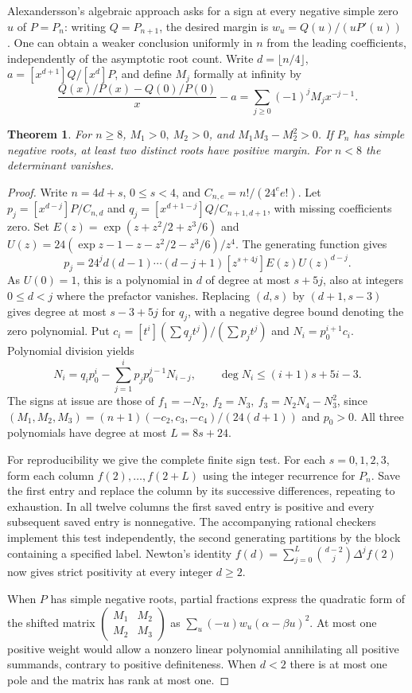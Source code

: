 \documentclass[11pt]{article}
\newtheorem{theorem}{Theorem}
\begin{document}
Alexandersson's algebraic approach asks for a sign at every negative simple
zero \(u\) of \(P=P_n\): writing \(Q=P_{n+1}\), the desired margin is
\(w_u=Q(u)/(uP'(u))\) \cite{rrdensity}. One can obtain a weaker conclusion
uniformly in \(n\) from the leading coefficients, independently of the
asymptotic root count. Write \(d=\lfloor n/4\rfloor\),
\(a=[x^{d+1}]Q/[x^d]P\), and define \(M_j\) formally at infinity by
\[
 \frac{Q(x)/P(x)-Q(0)/P(0)}{x}-a
       =\sum_{j\ge0}(-1)^jM_j x^{-j-1}.
\]
\begin{theorem}\label{thm:twopoles}
For \(n\ge8\), \(M_1>0,\ M_2>0\), and \(M_1M_3-M_2^2>0\).
If \(P_n\) has simple negative roots, at least two distinct roots have
positive margin. For \(n<8\) the determinant vanishes.
\end{theorem}
\begin{proof}
Write \(n=4d+s\), \(0\le s<4\), and \(C_{n,e}=n!/(24^e e!)\).
Let \(p_j=[x^{d-j}]P/C_{n,d}\) and
\(q_j=[x^{d+1-j}]Q/C_{n+1,d+1}\), with missing coefficients zero.
Set \(E(z)=\exp(z+z^2/2+z^3/6)\) and
\(U(z)=24(\exp z-1-z-z^2/2-z^3/6)/z^4\). The generating function gives
\[
 p_j=24^j d(d-1)\cdots(d-j+1)[z^{s+4j}]E(z)U(z)^{d-j}.
\]
As \(U(0)=1\), this is a polynomial in \(d\) of degree at most \(s+5j\),
also at integers \(0\le d<j\) where the prefactor vanishes. Replacing
\((d,s)\) by \((d+1,s-3)\) gives degree at most \(s-3+5j\)
for \(q_j\), with a negative degree bound denoting the zero polynomial.
Put \(c_i=[t^i](\sum q_jt^j)/(\sum p_jt^j)\) and
\(N_i=p_0^{i+1}c_i\). Polynomial division yields
\[
 N_i=q_i p_0^i-\sum_{j=1}^i p_jp_0^{j-1}N_{i-j},\qquad
 \deg N_i\le(i+1)s+5i-3 .
\]
The signs at issue are those of
\(f_1=-N_2,\ f_2=N_3,\ f_3=N_2N_4-N_3^2\), since
\((M_1,M_2,M_3)=(n+1)(-c_2,c_3,-c_4)/(24(d+1))\)
and \(p_0>0\). All three polynomials have degree at most \(L=8s+24\).

For reproducibility we give the complete finite sign test. For each
\(s=0,1,2,3\), form each column \(f(2),\ldots,f(2+L)\) using the
integer recurrence for \(P_n\). Save the first entry and replace the
column by its successive differences, repeating to exhaustion.
In all twelve columns the first saved entry is positive and every
subsequent saved entry is nonnegative. The accompanying rational
checkers implement this test independently, the second generating
partitions by the block containing a specified label. Newton's identity
\(f(d)=\sum_{j=0}^L\binom{d-2}{j}\Delta^j f(2)\)
now gives strict positivity at every integer \(d\ge2\).

When \(P\) has simple negative roots, partial fractions express the
quadratic form of the shifted matrix
\(\left(\begin{smallmatrix}M_1&M_2\\M_2&M_3\end{smallmatrix}\right)\)
as \(\sum_u(-u)w_u(\alpha-\beta u)^2\).
At most one positive weight would allow a nonzero linear polynomial
annihilating all positive summands, contrary to positive definiteness.
When \(d<2\) there is at most one pole and the matrix has rank at most one.
\end{proof}
\end{document}
